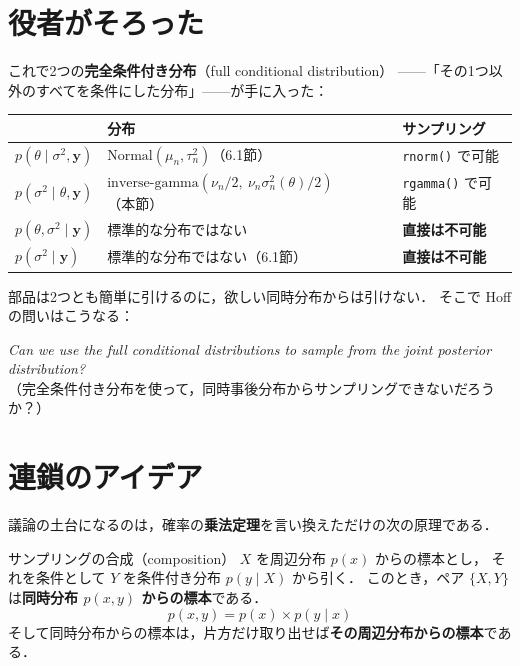 \documentclass[lualatex,ja=standard,a4paper,12pt]{bxjsarticle}
\begin{document}
\section{役者がそろった}

これで2つの\textbf{完全条件付き分布}（full conditional distribution）
——「その1つ以外のすべてを条件にした分布」——が手に入った：

\begin{center}
\renewcommand{\arraystretch}{1.8}
\begin{tabular}{lll}
\toprule
 & 分布 & サンプリング \\
\midrule
$p(\theta \mid \sigma^2, \boldsymbol{y})$
  & $\mathrm{Normal}(\mu_n, \tau_n^2)$（6.1節）
  & \texttt{rnorm()} で可能 \\
$p(\sigma^2 \mid \theta, \boldsymbol{y})$
  & $\mathrm{inverse\text{-}gamma}(\nu_n/2,\ \nu_n\sigma_n^2(\theta)/2)$（本節）
  & \texttt{rgamma()} で可能 \\
\midrule
$p(\theta, \sigma^2 \mid \boldsymbol{y})$
  & 標準的な分布ではない
  & \textbf{直接は不可能} \\
$p(\sigma^2 \mid \boldsymbol{y})$
  & 標準的な分布ではない（6.1節）
  & \textbf{直接は不可能} \\
\bottomrule
\end{tabular}
\end{center}

\medskip
\noindent 部品は2つとも簡単に引けるのに，欲しい同時分布からは引けない．
そこで Hoff の問いはこうなる：

\begin{center}
\textit{Can we use the full conditional distributions to sample from the joint posterior distribution?}\\
（完全条件付き分布を使って，同時事後分布からサンプリングできないだろうか？）
\end{center}

\section{連鎖のアイデア}

議論の土台になるのは，確率の\textbf{乗法定理}を言い換えただけの次の原理である．

\begin{defbox}{サンプリングの合成（composition）}
$X$ を周辺分布 $p(x)$ からの標本とし，
それを条件として $Y$ を条件付き分布 $p(y \mid X)$ から引く．
このとき，ペア $\{X, Y\}$ は\textbf{同時分布 $p(x,y)$ からの標本}である．
\[
  p(x, y) = p(x) \times p(y \mid x)
\]
そして同時分布からの標本は，片方だけ取り出せば\textbf{その周辺分布からの標本}である．
\end{defbox}
\end{document}
